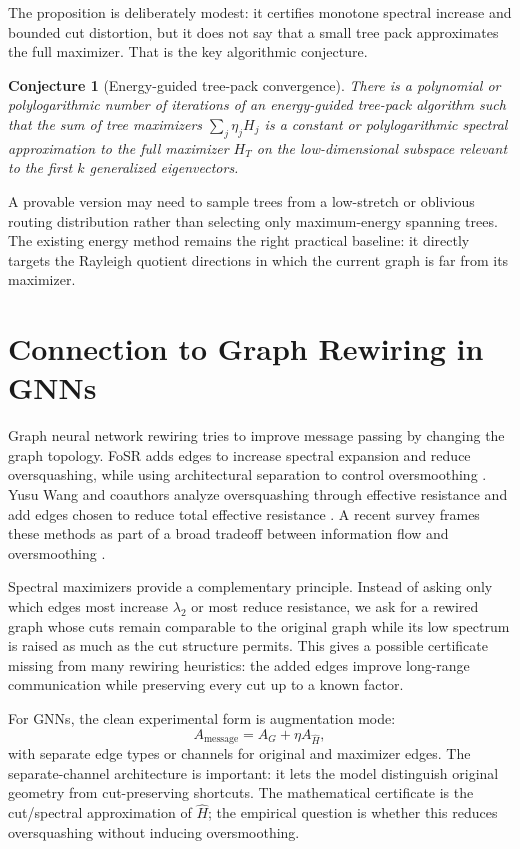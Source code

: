 \documentclass[11pt]{article}
\newtheorem{conjecture}[theorem]{Conjecture}
\begin{document}
The proposition is deliberately modest: it certifies monotone spectral
increase and bounded cut distortion, but it does not say that a small tree
pack approximates the full maximizer.  That is the key algorithmic conjecture.

\begin{conjecture}[Energy-guided tree-pack convergence]
\label{conj:tree-pack}
There is a polynomial or polylogarithmic number of iterations of an
energy-guided tree-pack algorithm such that the sum of tree maximizers
$\sum_j\eta_jH_j$ is a constant or polylogarithmic spectral approximation to
the full maximizer $H_T$ on the low-dimensional subspace relevant to the first
$k$ generalized eigenvectors.
\end{conjecture}

A provable version may need to sample trees from a low-stretch or oblivious
routing distribution rather than selecting only maximum-energy spanning trees.
The existing energy method remains the right practical baseline: it directly
targets the Rayleigh quotient directions in which the current graph is far
from its maximizer.

\section{Connection to Graph Rewiring in GNNs}

Graph neural network rewiring tries to improve message passing by changing
the graph topology.  FoSR adds edges to increase spectral expansion and reduce
oversquashing, while using architectural separation to control oversmoothing
\cite{karhadkar2023fosr}.  Yusu Wang and coauthors analyze oversquashing
through effective resistance and add edges chosen to reduce total effective
resistance \cite{black2023oversquashing}.  A recent survey frames these
methods as part of a broad tradeoff between information flow and
oversmoothing \cite{attali2026survey}.

Spectral maximizers provide a complementary principle.  Instead of asking only
which edges most increase $\lambda_2$ or most reduce resistance, we ask for a
rewired graph whose cuts remain comparable to the original graph while its
low spectrum is raised as much as the cut structure permits.  This gives a
possible certificate missing from many rewiring heuristics: the added edges
improve long-range communication while preserving every cut up to a known
factor.

For GNNs, the clean experimental form is augmentation mode:
\[
  A_{\mathrm{message}} = A_G + \eta A_{\widehat H},
\]
with separate edge types or channels for original and maximizer edges.  The
separate-channel architecture is important: it lets the model distinguish
original geometry from cut-preserving shortcuts.  The mathematical certificate
is the cut/spectral approximation of $\widehat H$; the empirical question is
whether this reduces oversquashing without inducing oversmoothing.
\end{document}
